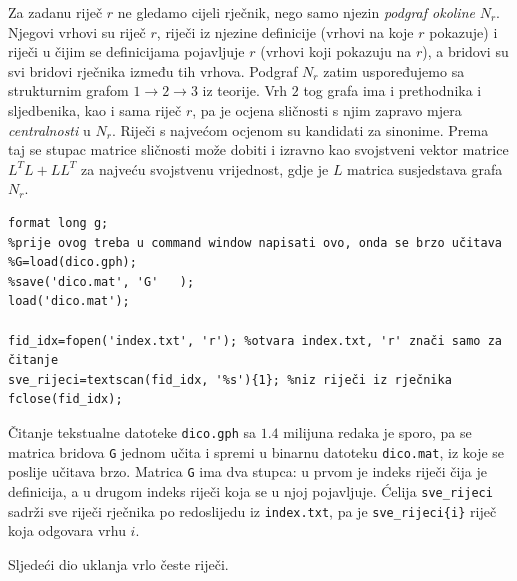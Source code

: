 \documentclass[12pt, letterpaper]{article}
\numberwithin{figure}{section}
\begin{document}
Za zadanu riječ $r$ ne gledamo cijeli rječnik, nego samo njezin \emph{podgraf okoline} $N_r$. Njegovi vrhovi su riječ $r$, riječi iz njezine definicije (vrhovi na koje $r$ pokazuje) i riječi u čijim se definicijama pojavljuje $r$ (vrhovi koji pokazuju na $r$), a bridovi su svi bridovi rječnika između tih vrhova. Podgraf $N_r$ zatim uspoređujemo sa strukturnim grafom $1\longrightarrow 2\longrightarrow 3$ iz teorije. Vrh $2$ tog grafa ima i prethodnika i sljedbenika, kao i sama riječ $r$, pa je ocjena sličnosti s njim zapravo mjera \emph{centralnosti} u $N_r$. Riječi s najvećom ocjenom su kandidati za sinonime. Prema~\cite{blondel2004similarity} taj se stupac matrice sličnosti može dobiti i izravno kao svojstveni vektor matrice $L^TL+LL^T$ za najveću svojstvenu vrijednost, gdje je $L$ matrica susjedstava grafa $N_r$. 


\begin{lstlisting}[style=octave, caption={Učitavanje rječnika}, label={lst:rj_ucitavanje}]
format long g;
%prije ovog treba u command window napisati ovo, onda se brzo učitava
%G=load(dico.gph);
%save('dico.mat', 'G'   );
load('dico.mat');

fid_idx=fopen('index.txt', 'r'); %otvara index.txt, 'r' znači samo za čitanje
sve_rijeci=textscan(fid_idx, '%s'){1}; %niz riječi iz rječnika
fclose(fid_idx);
\end{lstlisting}
Čitanje tekstualne datoteke \texttt{dico.gph} sa $1.4$ milijuna redaka je sporo, pa se matrica bridova \texttt{G} jednom učita i spremi u binarnu datoteku \texttt{dico.mat}, iz koje se poslije učitava brzo. Matrica \texttt{G} ima dva stupca: u prvom je indeks riječi čija je definicija, a u drugom indeks riječi koja se u njoj pojavljuje. Ćelija \texttt{sve\_rijeci} sadrži sve riječi rječnika po redoslijedu iz \texttt{index.txt}, pa je \texttt{sve\_rijeci\{i\}} riječ koja odgovara vrhu $i$.

Sljedeći dio uklanja vrlo česte riječi.
\end{document}
